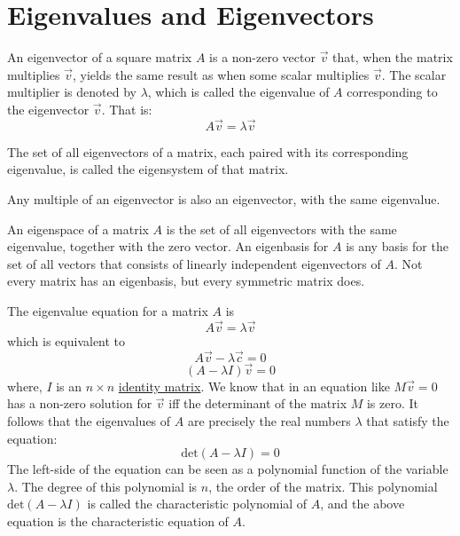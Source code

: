 \documentclass[conference,final,11pt,technote,onecolumn]{IEEEtran}\usepackage[]{graphicx}\usepackage[]{color}
\begin{document}
	\section{Eigenvalues and Eigenvectors}
	\label{term:eigenvalues_and_eigenvectors}
An eigenvector of a square matrix $A$ is a non-zero vector $\vec v$ that, when the matrix multiplies $\vec v$, yields the same result as when some scalar multiplies $\vec v$. The scalar multiplier is denoted by $\lambda$, which is called the eigenvalue of $A$ corresponding to the eigenvector $\vec v$. That is:
\[ A\vec v = \lambda\vec v\]

The set of all eigenvectors of a matrix, each paired with its corresponding eigenvalue, is called the eigensystem of that matrix\cite{press1987numerical}.

Any multiple of an eigenvector is also an eigenvector, with the same eigenvalue.

An eigenspace of a matrix $A$ is the set of all eigenvectors with the same eigenvalue, together with the zero vector. An eigenbasis for $A$ is any basis for the set of all vectors that consists of linearly independent eigenvectors of $A$. Not every matrix has an eigenbasis, but every symmetric matrix does.

The eigenvalue equation for a matrix $A$ is
\[ A\vec v = \lambda \vec v\]
which is equivalent to 
\[ A\vec v - \lambda \vec c = 0\]
\[ (A-\lambda I)\vec v = 0 \]
where, $I$ is an $n \times n$ \hyperref[term:identity_matrix]{identity matrix}. We know that in an equation like $M\vec v = 0$ has a non-zero solution for $\vec v$ iff the determinant of the matrix $M$ is zero. It follows that the eigenvalues of $A$ are precisely the real numbers $\lambda$ that satisfy the equation:
\[ \text{det}(A-\lambda I) = 0\]
The left-side of the equation can be seen as a polynomial function of the variable $\lambda$. The degree of this polynomial is $n$, the order of the matrix. This polynomial $\text{det}(A-\lambda I)$ is called the characteristic polynomial of $A$, and the above equation is the characteristic equation of $A$.
\end{document}
